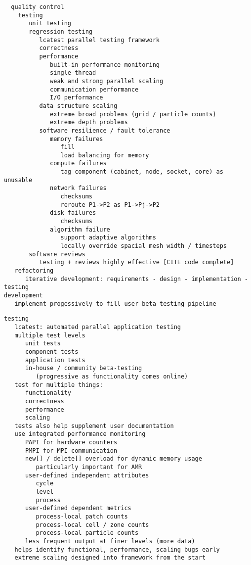 \documentclass[14pt,letter]{article}
\begin{document}
\begin{verbatim}
  quality control
    testing 
       unit testing
       regression testing
          lcatest parallel testing framework
          correctness
          performance
             built-in performance monitoring
             single-thread
             weak and strong parallel scaling 
             communication performance
             I/O performance
          data structure scaling
             extreme broad problems (grid / particle counts)
             extreme depth problems
          software resilience / fault tolerance
             memory failures
                fill
                load balancing for memory
             compute failures
                tag component (cabinet, node, socket, core) as unusable
             network failures
                checksums
                reroute P1->P2 as P1->Pj->P2
             disk failures
                checksums
             algorithm failure
                support adaptive algorithms
                locally override spacial mesh width / timesteps
       software reviews
          testing + reviews highly effective [CITE code complete]
   refactoring
      iterative development: requirements - design - implementation - testing   
development
   implement progessively to fill user beta testing pipeline
\end{verbatim}

\begin{verbatim}
testing
   lcatest: automated parallel application testing
   multiple test levels
      unit tests
      component tests
      application tests
      in-house / community beta-testing
         (progressive as functionality comes online)
   test for multiple things:
      functionality
      correctness
      performance
      scaling
   tests also help supplement user documentation
   use integrated performance monitoring
      PAPI for hardware counters
      PMPI for MPI communication
      new[] / delete[] overload for dynamic memory usage
         particularly important for AMR
      user-defined independent attributes
         cycle
         level
         process
      user-defined dependent metrics
         process-local patch counts
         process-local cell / zone counts
         process-local particle counts
      less frequent output at finer levels (more data)
   helps identify functional, performance, scaling bugs early
   extreme scaling designed into framework from the start
\end{verbatim}

\end{document}
